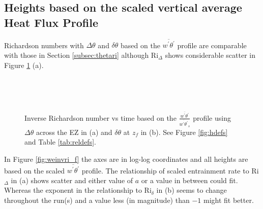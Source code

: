 \clearpage

\subsection{Heights based on the scaled vertical average Heat Flux Profile}

Richardson numbers with $\Delta \theta$ and $\delta \theta$ based on the $\overline{w^{'}\theta^{'}}$ profile are comparable with those in Section \ref{subsec:thetari} although \acs{Ri}$_{\Delta}$ shows considerable scatter in Figure \ref{fig:invristime_f} (a).

\begin{figure}[htbp]
\begin{minipage}[b]{0.5\linewidth}
         
        \\
        \end{minipage}             
\quad
\begin{minipage}[b]{0.5\linewidth}
        \\
       
       \end{minipage}
        \caption[Richardson numbers based on $\frac{\overline{w^{'}\theta^{'}}}{\overline{w^{'}\theta^{'}}_{s}}$]{Inverse Richardson number vs time based on the $\frac{\overline{w^{'}\theta^{'}}}{\overline{w^{'}\theta^{'}}_{s}}$
profile using $\Delta \theta$ across the \acs{EZ} in (a) and $\delta \theta$ at $z_{f}$ in (b).  See Figure \ref{fig:hdefs} and Table \ref{tab:reldefs}.}
        \label{fig:invristime_f}
\end{figure}

In Figure \ref{fig:weinvri_f} the axes are in log-log coordinates and all heights are based on the scaled $\overline{w^{'}\theta^{'}}$ profile. The relationship of scaled entrainment rate to \acs{Ri}$_{\Delta}$ in (a) shows scatter and either value of $a$ or a value in between could fit.  Whereas the exponent in the relationship to \acs{Ri}$_{\delta}$ in (b) seems to change throughout the run(s) and a value less (in magnitude) than $-1$ might fit better. \\    

